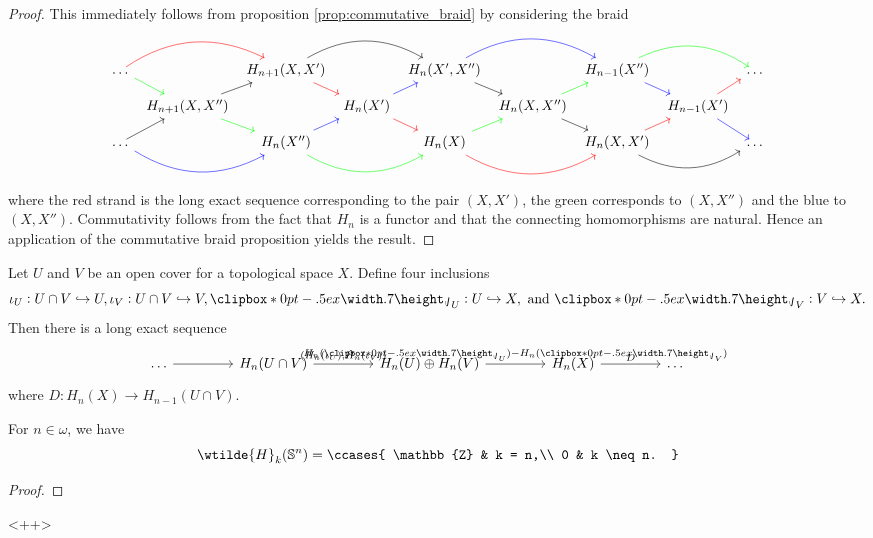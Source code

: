 \begin{proof}
	This immediately follows from proposition \ref{prop:commutative_braid} by considering the braid
	\begin{equation*}
		\begin{tikzcd}[column sep=1ex, row sep=2ex]
			\dots \arrow[dr,green]\arrow[rr,red, bend left] & & H_{n + 1}(X,X')\arrow[rr,bend left]\arrow[dr,red] & & H_n(X',X'') \arrow[rr,blue,bend left]\arrow[dr] & & H_{n - 1}(X'')\arrow[rr,green,bend left]\arrow[dr,blue] & & \dots\\
			& H_{n + 1}(X,X'') \arrow[ur]\arrow[dr,green] & & H_n(X') \arrow[dr,red]\arrow[ur,blue] & & H_n(X,X'') \arrow[dr]\arrow[ur,green] & & H_{n - 1}(X')\arrow[dr,blue]\arrow[ur,red]\\
			\dots \arrow[ur]\arrow[rr,blue,bend right] & & H_n(X'') \arrow[ur,blue]\arrow[rr,bend right, green] & & H_n(X) \arrow[rr,bend right,red]\arrow[ur,green] & & H_n(X,X') \arrow[rr,bend right]\arrow[ur,red] & & \dots
		\end{tikzcd}
	\end{equation*}
	\noindent where the red strand is the long exact sequence corresponding to the pair $(X,X')$, the green corresponds to $(X,X'')$ and the blue to $(X,X'')$. Commutativity follows from the fact that $H_n$ is a functor and that the connecting homomorphisms are natural. Hence an application of the commutative braid proposition yields the result.
\end{proof}

\begin{theorem}
	\label{thm:Mayer_Vietoris}
	Let $U$ and $V$ be an open cover for a topological space $X$. Define four inclusions 
	\begin{equation*}
		\iota_U : U \cap V \hookrightarrow U, \iota_V : U \cap V \hookrightarrow V, \jota_U : U \hookrightarrow X, \text{ and } \jota_V : V \hookrightarrow X.
	\end{equation*}
	Then there is a long exact sequence
	\begin{equation*}
		\begin{tikzcd}[column sep=10ex]
			\dots \arrow[r] & H_n(U \cap V) \arrow[r,"{(H_n(\iota_U),H_n(\iota_V))}"] & H_n(U) \oplus H_n(V) \arrow[r,"{H_n(\jota_U)-H_n(\jota_V)}"] & H_n(X) \arrow[r,"D"] & \dots
		\end{tikzcd}
	\end{equation*}
	\noindent where $D : H_n(X) \to H_{n - 1}(U \cap V)$.
\end{theorem}

\begin{proposition}
	For $n \in \omega$, we have
	\begin{equation*}
		\wtilde{H}_k(\mathbb{S}^n) = \ccases{
			\mathbb{Z} & k = n,\\
			0 & k \neq n.
		}
	\end{equation*} 
\end{proposition}

\begin{proof}
	
\end{proof}<++>
